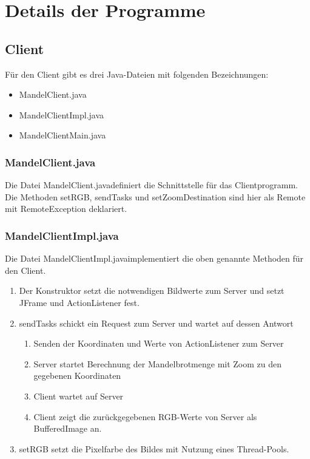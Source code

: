 \documentclass{article}
\begin{document}
\section{Details der Programme}
\subsection{Client}
	Für den Client gibt es drei Java-Dateien mit folgenden Bezeichnungen:
	\begin{itemize}
		\item MandelClient.java
		\item MandelClientImpl.java
		\item MandelClientMain.java
	\end{itemize}
\subsubsection{MandelClient.java}
	Die Datei \glqq MandelClient.java\grqq definiert die Schnittstelle für das Clientprogramm. Die Methoden setRGB, sendTasks und setZoomDestination sind hier als Remote mit RemoteException deklariert.
	

	\newpage
\subsubsection{MandelClientImpl.java}
	Die Datei \glqq MandelClientImpl.java\grqq implementiert die oben genannte Methoden für den Client.\\

	\begin{enumerate}
		\item Der Konstruktor setzt die notwendigen Bildwerte zum Server und setzt JFrame und ActionListener fest.\\
			
		\item sendTasks schickt ein Request zum Server und wartet auf dessen Antwort\\
			\begin{enumerate}
				\item Senden der Koordinaten und Werte von ActionListener zum Server
				\item Server startet Berechnung der Mandelbrotmenge mit Zoom zu den gegebenen Koordinaten
				\item Client wartet auf Server
				\item Client zeigt die zurückgegebenen RGB-Werte von Server als BufferedImage an.
			\end{enumerate}
			
		\item setRGB setzt die Pixelfarbe des Bildes mit Nutzung eines Thread-Pools.
			
	\end{enumerate}
	
\end{document}
